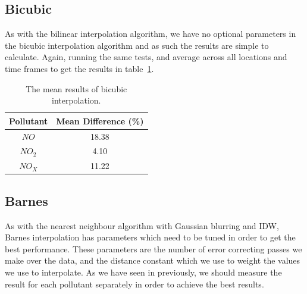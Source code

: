         \subsection{Bicubic}\label{prediction_evaluation_results_bicubic}


			As with the bilinear interpolation algorithm, we have no optional parameters in the bicubic interpolation algorithm and as such the results are simple to calculate. Again, running the same tests, and average across all locations and time frames to get the results in table~\ref{tab:bicubic_results}.

        	\begin{table}
				\centering
	    		\begin{tabular}{|c|c|}
	    			\hline
					Pollutant & Mean Difference (\%) \\ \hline
					$NO$ & 18.38 \\
					$NO_{2}$ & 4.10 \\
					$NO_{X}$ & 11.22 \\
					\hline
				\end{tabular}
				\caption{The mean results of bicubic interpolation.}
				\label{tab:bicubic_results}
			\end{table} 

        \subsection{Barnes}\label{prediction_evaluation_results_barnes}


        	As with the nearest neighbour algorithm with Gaussian blurring and IDW, Barnes interpolation has parameters which need to be tuned in order to get the best performance. These parameters are the number of error correcting passes we make over the data, and the distance constant which we use to weight the values we use to interpolate. As we have seen in previously, we should measure the result for each pollutant separately in order to achieve the best results. 

